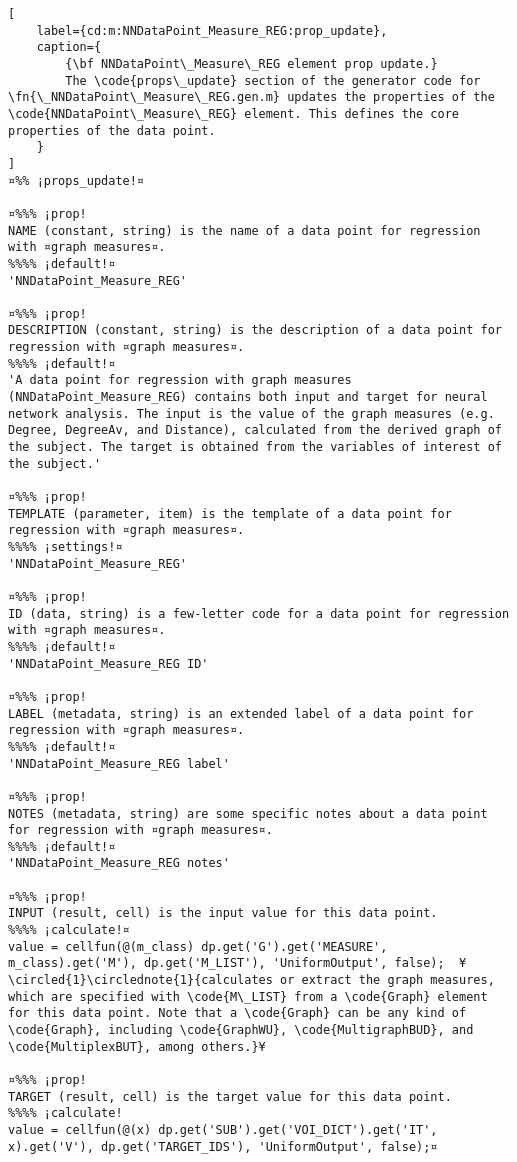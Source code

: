 \documentclass{tufte-handout}
\begin{document}
\begin{lstlisting}[
	label={cd:m:NNDataPoint_Measure_REG:prop_update},
	caption={
		{\bf NNDataPoint\_Measure\_REG element prop update.}
		The \code{props\_update} section of the generator code for \fn{\_NNDataPoint\_Measure\_REG.gen.m} updates the properties of the \code{NNDataPoint\_Measure\_REG} element. This defines the core properties of the data point.
	}
]
¤%% ¡props_update!¤

¤%%% ¡prop!
NAME (constant, string) is the name of a data point for regression with ¤graph measures¤.
%%%% ¡default!¤
'NNDataPoint_Measure_REG'

¤%%% ¡prop!
DESCRIPTION (constant, string) is the description of a data point for regression with ¤graph measures¤.
%%%% ¡default!¤
'A data point for regression with graph measures (NNDataPoint_Measure_REG) contains both input and target for neural network analysis. The input is the value of the graph measures (e.g. Degree, DegreeAv, and Distance), calculated from the derived graph of the subject. The target is obtained from the variables of interest of the subject.'

¤%%% ¡prop!
TEMPLATE (parameter, item) is the template of a data point for regression with ¤graph measures¤.
%%%% ¡settings!¤
'NNDataPoint_Measure_REG'

¤%%% ¡prop!
ID (data, string) is a few-letter code for a data point for regression with ¤graph measures¤.
%%%% ¡default!¤
'NNDataPoint_Measure_REG ID'

¤%%% ¡prop!
LABEL (metadata, string) is an extended label of a data point for regression with ¤graph measures¤.
%%%% ¡default!¤
'NNDataPoint_Measure_REG label'

¤%%% ¡prop!
NOTES (metadata, string) are some specific notes about a data point for regression with ¤graph measures¤.
%%%% ¡default!¤
'NNDataPoint_Measure_REG notes'

¤%%% ¡prop!
INPUT (result, cell) is the input value for this data point.
%%%% ¡calculate!¤ 
value = cellfun(@(m_class) dp.get('G').get('MEASURE', m_class).get('M'), dp.get('M_LIST'), 'UniformOutput', false);  ¥\circled{1}\circlednote{1}{calculates or extract the graph measures, which are specified with \code{M\_LIST} from a \code{Graph} element for this data point. Note that a \code{Graph} can be any kind of \code{Graph}, including \code{GraphWU}, \code{MultigraphBUD}, and \code{MultiplexBUT}, among others.}¥
    
¤%%% ¡prop!
TARGET (result, cell) is the target value for this data point.
%%%% ¡calculate!
value = cellfun(@(x) dp.get('SUB').get('VOI_DICT').get('IT', x).get('V'), dp.get('TARGET_IDS'), 'UniformOutput', false);¤

\end{lstlisting}
\end{document}
